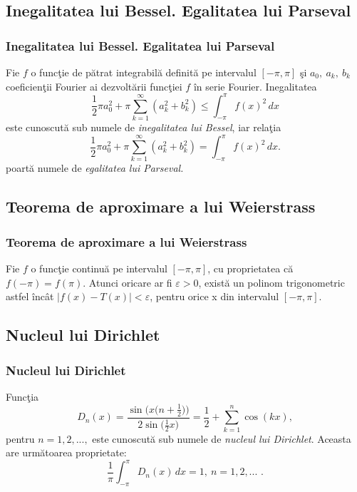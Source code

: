 \documentclass{beamer}
\begin{document}
\begin{frame}
\subsection{Inegalitatea lui Bessel. Egalitatea lui Parseval}
\frametitle{Inegalitatea lui Bessel. Egalitatea lui Parseval}
\hspace*{20pt}Fie $f$ o func\c tie de p\u atrat integrabil\u a definit\u a pe intervalul $[-\pi, \pi]$ \c si $a_0,\:a_k, \: b_k$ coeficien\c tii Fourier ai dezvolt\u arii func\c tiei $f$ \^ in serie Fourier. Inegalitatea
\begin{equation*}
\frac{1}{2}\pi a_0^2 + \pi \sum_{k=1}^{\infty}(a_k^2 + b_k^2) \leq \int_{-\pi}^{\pi} f(x)^2\,dx
\end{equation*}
este cunoscut\u a sub numele de \textit{inegalitatea lui Bessel}, iar rela\c tia 
\begin{equation*}
\frac{1}{2}\pi a_0^2 + \pi \sum_{k=1}^{\infty}(a_k^2 + b_k^2) = \int_{-\pi}^{\pi} f(x)^2\,dx.
\end{equation*}
poart\u a numele de \textit{egalitatea lui Parseval.}
\end{frame}

\begin{frame}
\subsection*{Teorema de aproximare a lui Weierstrass}
\frametitle{Teorema de aproximare a lui Weierstrass}
\hspace*{20pt}Fie $f$ o func\c tie continu\u a pe intervalul $[-\pi, \pi]$, cu proprietatea c\u a $f(-\pi) = f(\pi)$. Atunci oricare ar fi $\varepsilon > 0$, exist\u a un polinom trigonometric astfel \^ inc\^ at $\left | f(x) - T(x) \right | < \varepsilon$, pentru orice x din intervalul $[-\pi, \pi]$.
\end{frame}


\begin{frame}
\subsection*{Nucleul lui Dirichlet}
\frametitle{Nucleul lui Dirichlet}
\hspace*{20pt}Func\c tia 
\begin{equation*}
D_n(x) =  \frac{\sin\Big(x\big(n + \frac{1}{2}\big)\Big)}{2\sin\big(\frac{1}{2}x\big)}=\frac{1}{2} + \sum_{k=1}^{n}\cos(kx),
\end{equation*}
pentru $n=1, 2, ...,$ este cunoscut\u a sub numele de \textit{nucleul lui Dirichlet}. Aceasta are urm\u atoarea proprietate:
\begin{equation*}
\frac{1}{\pi}
\int_{-\pi}^{\pi} D_n(x)\, dx = 1,\: n = 1, 2, ...\text{ .} 
\end{equation*}
\end{frame}
\end{document}
